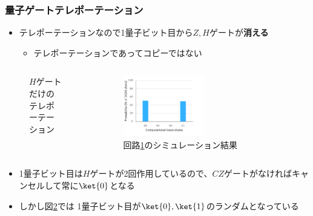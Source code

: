 \begin{frame}
  \frametitle{量子ゲートテレポーテーション}

  \begin{itemize}
    \item テレポーテーションなので1量子ビット目から$Z, H$ゲートが\textbf{消える}
    \begin{itemize}
      \item テレポーテーションであってコピーではない
    \end{itemize}
  \end{itemize}

  \begin{columns}
    \begin{column}{0.5\textwidth}
      \begin{figure}
        \caption{$H$ゲートだけのテレポーテーション}
        \label{fig:h_gate_teleportation}
      \end{figure}
    \end{column}
    \begin{column}{0.5\textwidth}
      \begin{figure}
        \includegraphics[width=0.5\textwidth]{./img/h_gate_teleportation.pdf}
        \caption{回路\ref{fig:h_gate_teleportation}のシミュレーション結果}
        \label{fig:h_gate_teleportation_histogram}
      \end{figure}
    \end{column}
  \end{columns}

  \pause
  \begin{itemize}
    \item<+-> 1量子ビット目は$H$ゲートが2回作用しているので、$CZ$ゲートがなければキャンセルして常に$\ket{0}$となる

    \item<+-> しかし図\ref{fig:h_gate_teleportation_histogram}では
    1量子ビット目が$\ket{0},\ket{1}$のランダムとなっている
  \end{itemize}
\end{frame}

